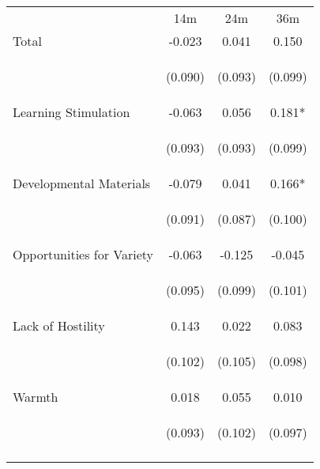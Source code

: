 \begin{tabular}{lccc}
\hline \noalign{\smallskip} & 14m & 24m & 36m\\
\noalign{\smallskip}\hline \noalign{\smallskip}Total & -0.023 & 0.041 & 0.150\\
 & \begin{footnotesize}(0.090)\end{footnotesize} & \begin{footnotesize}(0.093)\end{footnotesize} & \begin{footnotesize}(0.099)\end{footnotesize}\\
\noalign{\smallskip}Learning Stimulation & -0.063 & 0.056 & 0.181*\\
 & \begin{footnotesize}(0.093)\end{footnotesize} & \begin{footnotesize}(0.093)\end{footnotesize} & \begin{footnotesize}(0.099)\end{footnotesize}\\
\noalign{\smallskip}Developmental Materials & -0.079 & 0.041 & 0.166*\\
 & \begin{footnotesize}(0.091)\end{footnotesize} & \begin{footnotesize}(0.087)\end{footnotesize} & \begin{footnotesize}(0.100)\end{footnotesize}\\
\noalign{\smallskip}Opportunities for Variety & -0.063 & -0.125 & -0.045\\
 & \begin{footnotesize}(0.095)\end{footnotesize} & \begin{footnotesize}(0.099)\end{footnotesize} & \begin{footnotesize}(0.101)\end{footnotesize}\\
\noalign{\smallskip}Lack of Hostility & 0.143 & 0.022 & 0.083\\
 & \begin{footnotesize}(0.102)\end{footnotesize} & \begin{footnotesize}(0.105)\end{footnotesize} & \begin{footnotesize}(0.098)\end{footnotesize}\\
\noalign{\smallskip}Warmth & 0.018 & 0.055 & 0.010\\
 & \begin{footnotesize}(0.093)\end{footnotesize} & \begin{footnotesize}(0.102)\end{footnotesize} & \begin{footnotesize}(0.097)\end{footnotesize}\\
\noalign{\smallskip}\hline\end{tabular}\\
